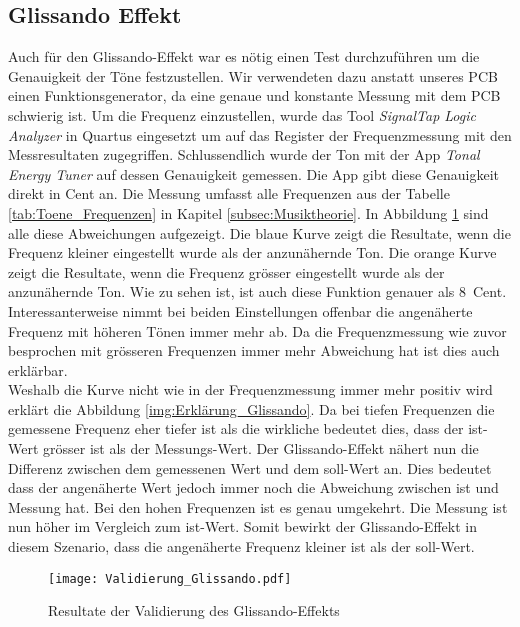 \subsection{Glissando Effekt}\label{subsec:Glissando_Effekt}
Auch für den Glissando-Effekt war es nötig einen Test durchzuführen um die Genauigkeit der Töne festzustellen. Wir verwendeten dazu anstatt unseres PCB einen Funktionsgenerator, da eine genaue und konstante Messung mit dem PCB schwierig ist. Um die Frequenz einzustellen, wurde das Tool \textit{SignalTap Logic Analyzer} in Quartus eingesetzt um auf das Register der Frequenzmessung mit den Messresultaten zugegriffen. Schlussendlich wurde der Ton mit der App \textit{Tonal Energy Tuner} auf dessen Genauigkeit gemessen. Die App gibt diese Genauigkeit direkt in Cent an. Die Messung umfasst alle Frequenzen aus der Tabelle \ref{tab:Toene_Frequenzen} in Kapitel \ref{subsec:Musiktheorie}. In Abbildung \ref{img:Validierung_Glissando} sind alle diese Abweichungen aufgezeigt. Die blaue Kurve  zeigt die Resultate, wenn die Frequenz kleiner eingestellt wurde als der anzunähernde Ton. Die orange Kurve zeigt die Resultate, wenn die Frequenz grösser eingestellt wurde als der anzunähernde Ton. Wie zu sehen ist, ist auch diese Funktion genauer als \SI{8}{Cent}. Interessanterweise nimmt bei beiden Einstellungen offenbar die angenäherte Frequenz mit höheren Tönen immer mehr ab. Da die Frequenzmessung wie zuvor besprochen mit grösseren Frequenzen immer mehr Abweichung hat ist dies auch erklärbar.\\
Weshalb die Kurve nicht wie in der Frequenzmessung immer mehr positiv wird erklärt die Abbildung \ref{img:Erklärung_Glissando}. Da bei tiefen Frequenzen die gemessene Frequenz eher tiefer ist als die wirkliche bedeutet dies, dass der ist-Wert grösser ist als der Messungs-Wert. Der Glissando-Effekt nähert nun die Differenz zwischen dem gemessenen Wert und dem soll-Wert an. Dies bedeutet dass der angenäherte Wert jedoch immer noch die Abweichung zwischen ist und Messung hat. Bei den hohen Frequenzen ist es genau umgekehrt. Die Messung ist nun höher im Vergleich zum ist-Wert. Somit bewirkt der Glissando-Effekt in diesem Szenario, dass die angenäherte Frequenz kleiner ist als der soll-Wert.


\begin{figure}[h!]
	\centering
	\texttt{[image: Validierung\_Glissando.pdf]}
	\caption{Resultate der Validierung des Glissando-Effekts} 
	\label{img:Validierung_Glissando}
\end{figure}  

